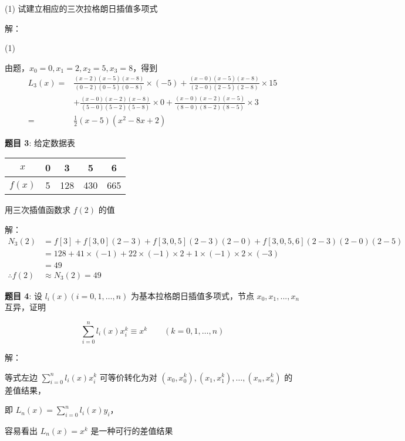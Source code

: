 \documentclass{article}
\begin{document}
(1) 试建立相应的三次拉格朗日插值多项式

\noindent 解：

\noindent (1)

由题，$x_0 = 0, x_1 = 2, x_2 = 5, x_3 = 8$，得到
$$
\begin{aligned}
L_3(x) =& \frac{(x - 2)(x - 5)(x - 8)}{(0 - 2)(0 - 5)(0 - 8)}\times (-5) + \frac{(x - 0)(x - 5)(x - 8)}{(2 - 0)(2 - 5)(2 - 8)}\times 15 \\
&+ \frac{(x - 0)(x - 2)(x - 8)}{(5 - 0)(5 - 2)(5 - 8)}\times 0 + \frac{(x - 0)(x - 2)(x - 5)}{(8 - 0)(8 - 2)(8 - 5)}\times 3 \\
=& \frac{1}{2}(x - 5)(x^2 - 8x + 2)
\end{aligned}
$$

\noindent\textbf{题目 3}: 给定数据表

\begin{center}
    \begin{tabular}{|c|c|c|c|c|}
        \hline
        $x$ & 0 & 3 & 5 & 6 \\
        \hline
        $f(x)$ & 5 & 128 & 430 & 665 \\
        \hline
    \end{tabular}
\end{center}

用三次插值函数求 $f(2)$ 的值

\noindent 解：
$$
\begin{aligned}
N_3(2) &= f[3] + f[3, 0](2 - 3) + f[3, 0, 5](2 - 3)(2 - 0) + f[3, 0, 5, 6](2 - 3)(2 - 0)(2 - 5) \\
&= 128 + 41\times (-1) + 22\times (-1)\times 2 + 1\times (-1)\times 2\times (-3) \\
&= 49 \\
\therefore f(2) &\approx N_3(2) = 49
\end{aligned}
$$

\noindent\textbf{题目 4}: 设 $l_i(x) (i = 0, 1, \ldots, n)$ 为基本拉格朗日插值多项式，节点 $x_0, x_1, ..., x_n$ 互异，证明

$$
\sum\limits_{i = 0}^{n}l_i(x)x_i^k \equiv x^k \quad\quad (k = 0, 1, \ldots, n)
$$

\noindent 解：

等式左边 $\sum\limits_{i = 0}^{n}l_i(x)x_i^k$ 可等价转化为对 $(x_0, x_0^k), (x_1, x_1^k), \ldots, (x_n, x_n^k)$ 的差值结果，

即 $L_n(x) = \sum\limits_{i = 0}^{n}l_i(x)y_i$，

容易看出 $L_n(x) = x^k$ 是一种可行的差值结果
\end{document}

